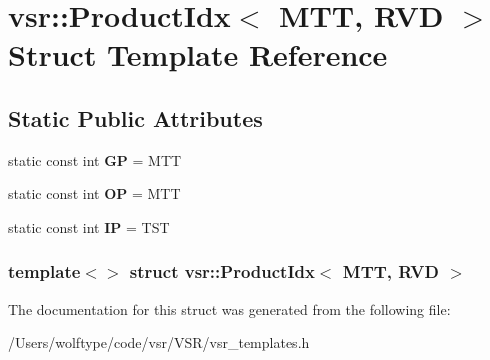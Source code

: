 \hypertarget{structvsr_1_1_product_idx_3_01_m_t_t_00_01_r_v_d_01_4}{\section{vsr\-:\-:Product\-Idx$<$ M\-T\-T, R\-V\-D $>$ Struct Template Reference}
\label{structvsr_1_1_product_idx_3_01_m_t_t_00_01_r_v_d_01_4}
}
\subsection*{Static Public Attributes}
\begin{DoxyCompactItemize}
\item 
\hypertarget{structvsr_1_1_product_idx_3_01_m_t_t_00_01_r_v_d_01_4_a6ac560e66d3fe9c82eaf9403000f2e9f}{static const int {\bfseries G\-P} = M\-T\-T}\label{structvsr_1_1_product_idx_3_01_m_t_t_00_01_r_v_d_01_4_a6ac560e66d3fe9c82eaf9403000f2e9f}

\item 
\hypertarget{structvsr_1_1_product_idx_3_01_m_t_t_00_01_r_v_d_01_4_a37a3a9aba59dcd2b95d348c1f979d0a7}{static const int {\bfseries O\-P} = M\-T\-T}\label{structvsr_1_1_product_idx_3_01_m_t_t_00_01_r_v_d_01_4_a37a3a9aba59dcd2b95d348c1f979d0a7}

\item 
\hypertarget{structvsr_1_1_product_idx_3_01_m_t_t_00_01_r_v_d_01_4_ac6e9f95a2128e16319e6f6b308e524b8}{static const int {\bfseries I\-P} = T\-S\-T}\label{structvsr_1_1_product_idx_3_01_m_t_t_00_01_r_v_d_01_4_ac6e9f95a2128e16319e6f6b308e524b8}

\end{DoxyCompactItemize}
\subsubsection*{template$<$$>$ struct vsr\-::\-Product\-Idx$<$ M\-T\-T, R\-V\-D $>$}



The documentation for this struct was generated from the following file\-:\begin{DoxyCompactItemize}
\item 
/\-Users/wolftype/code/vsr/\-V\-S\-R/vsr\-\_\-templates.\-h\end{DoxyCompactItemize}
